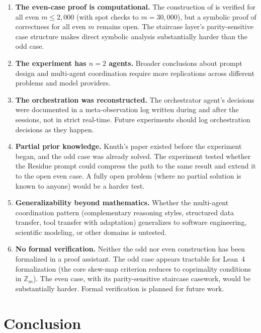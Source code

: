 \documentclass[11pt]{article}
\theoremstyle{definition}
\theoremstyle{remark}
\newcommand{\Zm}{\mathbb{Z}_m}
\begin{document}
\begin{enumerate}
    \item \textbf{The even-case proof is computational.} The construction of  is verified for all even $m \leq 2{,}000$ (with spot checks to $m = 30{,}000$), but a symbolic proof of correctness for all even $m$ remains open. The staircase layer's parity-sensitive case structure makes direct symbolic analysis substantially harder than the odd case.

    \item \textbf{The experiment has $n = 2$ agents.} Broader conclusions about prompt design and multi-agent coordination require more replications across different problems and model providers.

    \item \textbf{The orchestration was reconstructed.} The orchestrator agent's decisions were documented in a meta-observation log written during and after the sessions, not in strict real-time. Future experiments should log orchestration decisions as they happen.

    \item \textbf{Partial prior knowledge.} Knuth's paper existed before the experiment began, and the odd case was already solved. The experiment tested whether the Residue prompt could compress the path to the same result and extend it to the open even case. A fully open problem (where no partial solution is known to anyone) would be a harder test.

    \item \textbf{Generalizability beyond mathematics.} Whether the multi-agent coordination pattern (complementary reasoning styles, structured data transfer, tool transfer with adaptation) generalizes to software engineering, scientific modeling, or other domains is untested.

    \item \textbf{No formal verification.} Neither the odd nor even construction has been formalized in a proof assistant. The odd case appears tractable for Lean~4 formalization (the core skew-map criterion reduces to coprimality conditions in $\Zm$). The even case, with its parity-sensitive staircase casework, would be substantially harder. Formal verification is planned for future work.
\end{enumerate}

\section{Conclusion}
\label{sec:conclusion}
\end{document}
